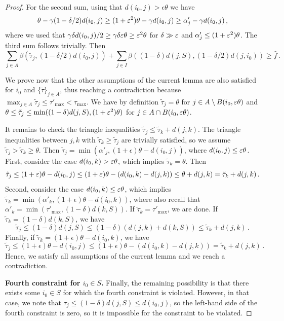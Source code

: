 \begin{proof}
For the second sum, using that $d(i_0, j) > \epsilon \theta$ we have 
\[\theta - \gamma (1 - \delta/2) d(i_0, j) \geq (1+\varepsilon^2) \theta - \gamma d(i_0, j) \geq \alpha_j' - \gamma d(i_0, j)\,,\]
where we used that $\gamma \delta d(i_0, j) / 2 \geq \gamma \delta \varepsilon \theta \geq \varepsilon^2 \theta$ for $\delta \gg \varepsilon$ and $\alpha_j' \leq (1+\varepsilon^2) \theta$.
The third sum follows trivially.
Then
\[\sum_{j \in A} \beta(\tilde\tau_j, (1-\delta/2) d(i_0, j)) + \sum_{j \in I}\beta((1-\delta)d(j,S), (1-\delta/2)d(j, i_0)) \geq \hat{f}\,.\]

We prove now that the other assumptions of the current lemma are also satisfied for $i_0$ and $\{\tilde\tau\}_{j \in A}$, thus reaching a contradiction because $\max_{j \in A}\tilde\tau_j \leq \tau'_{\max} < \tau_{\max}$.
We have by definition $\tilde\tau_j = \theta$ for $j \in A \setminus B(i_0, \varepsilon \theta)$ and $\theta \leq \tilde\tau_j \leq \min((1-\delta)d(j,S),(1+\varepsilon^2)\theta)$ for $j \in A \cap B(i_0, \varepsilon \theta)$.

It remains to check the triangle inequalities $\tilde\tau_j \leq \tilde\tau_k + d(j, k)$.
The triangle inequalities between $j, k$ with $\tilde\tau_k \geq \tilde\tau_j$ are trivially satisfied, so we assume $\tilde\tau_j > \tilde\tau_k \geq \theta$.
Then $\tilde\tau_j = \min(\alpha'_j, (1+\epsilon) \theta - d(i_0, j))$, where $d(i_0, j) \leq \varepsilon \theta$.
First, consider the case $d(i_0, k) > \varepsilon \theta$, which implies $\tilde\tau_k = \theta$.
Then
\[\tilde\tau_j \leq (1+\varepsilon)\theta - d(i_0, j) \leq (1+\varepsilon)\theta - (d(i_0, k) - d(j, k)) \leq \theta + d(j, k) = \tilde\tau_k + d(j, k)\,.\]
Second, consider the case $d(i_0, k) \leq \varepsilon \theta$, which implies $\tilde\tau_k = \min(\alpha'_k, (1+\epsilon) \theta - d(i_0, k))$, where also recall that $\alpha'_k = \min(\tau'_{\max}, (1-\delta)d(k, S))$.
If $\tilde\tau_k = \tau'_{\max}$, we are done.
If $\tilde\tau_k = (1-\delta)d(k, S)$, we have 
\[\tilde\tau_j \leq (1-\delta) d(j,S) \leq (1-\delta)(d(j,k)+d(k,S)) \leq \tilde\tau_k + d(j,k)\,.\]
Finally, if $\tilde\tau_k = (1+\epsilon) \theta - d(i_0, k)$, we have
\[\tilde\tau_j \leq (1+\epsilon) \theta - d(i_0, j) \leq (1+\epsilon) \theta - (d(i_0, k) - d(j, k)) = \tilde\tau_k + d(j,k)\,.\]
Hence, we satisfy all assumptions of the current lemma and we reach a contradiction.

\textbf{Fourth constraint for $i_0 \in S$.}
Finally, the remaining possibility is that there exists some $i_0 \in S$ for which the fourth constraint is violated.
However, in that case, we note that $\tau_j \leq (1-\delta) d(j, S) \leq d(i_0, j)$, so the left-hand side of the fourth constraint is zero, so it is impossible for the constraint to be violated.
\end{proof}


